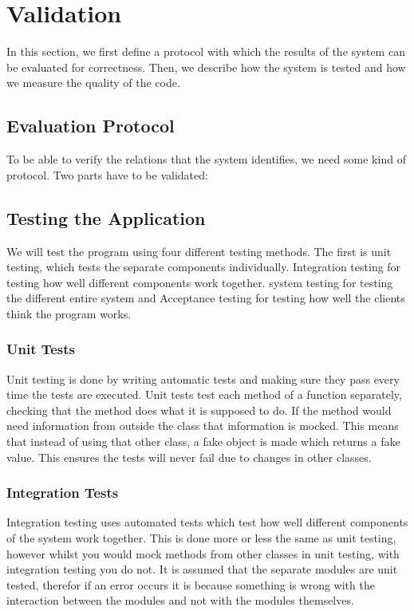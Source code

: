 \section{Validation}
In this section, we first define a protocol with which the results of the system can be evaluated for correctness. Then, we describe how the system is tested and how we measure the quality of the code.

\subsection{Evaluation Protocol}
To be able to verify the relations that the system identifies, we need some kind of protocol. Two parts have to be validated:

\subsection{Testing the Application}
We will test the program using four different testing methods. The first is unit testing, which tests the separate components individually. Integration testing for testing how well different components work together. system testing for testing the different entire system and Acceptance testing for testing how well the clients think the program works.

\subsubsection{Unit Tests}
Unit testing is done by writing automatic tests and making sure they pass every time the tests are executed. Unit tests test each method of a function separately, checking that the method does what it is supposed to do. If the method would need information from outside the class that information is mocked. This means that instead of using that other class, a fake object is made which returns a fake value. This ensures the tests will never fail due to changes in other classes.

\subsubsection{Integration Tests}
Integration testing uses automated tests which test how well different components of the system work together. This is done more or less the same as unit testing, however whilst you would mock methods from other classes in unit testing, with integration testing you do not. It is assumed that the separate modules are unit tested, therefor if an error occurs it is because something is wrong with the interaction between the modules and not with the modules themselves. 

